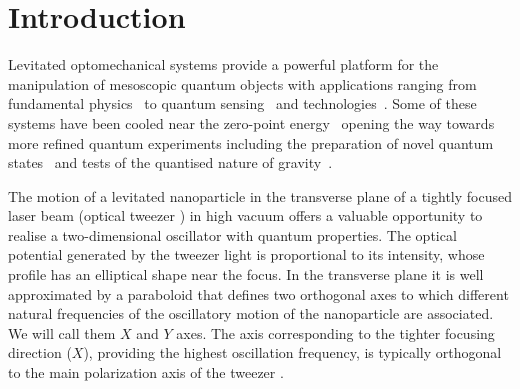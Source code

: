 \documentclass[11pt,floatfix,amssymb,prx,aps,longbibliography,superscriptaddress,nopacs]{revtex4-2}
\begin{document}
\maketitle

\section*{Introduction}
Levitated optomechanical systems provide a powerful platform for the manipulation of mesoscopic quantum objects with applications ranging from fundamental physics~\cite{Li2010,Moore2022,Gratta2014} to quantum sensing~\cite{Geraci2010,Tania2024} and technologies~\cite{Vinante2024}. Some of these systems have been cooled near the zero-point energy~\cite{Delic2020,Ranfagni2022,Piotrowski2023,Magrini2021,Tebbenjohanns2021} opening the way towards more refined quantum experiments including the preparation of novel quantum states~\cite{RomeroIsart2024,Neumeier2024,Nothup2024,Frimmer2024} and tests of the quantised nature of gravity~\cite{Bose2017}.

The motion of a levitated nanoparticle in the transverse plane of a tightly focused laser beam (optical tweezer \cite{Ashkin1970}) in high vacuum \cite{Millen2020,Gonzalez-Ballestero2021} offers a valuable opportunity to realise a two-dimensional oscillator with quantum properties. The optical potential generated by the tweezer light is proportional to its intensity, whose profile has an elliptical shape near the focus. In the transverse plane it is well approximated by a paraboloid that defines two orthogonal axes to which different natural frequencies of the oscillatory motion of the nanoparticle are associated. We will call them $X$ and $Y$ axes. The axis corresponding to the tighter focusing direction ($X$), providing the highest oscillation frequency, is typically orthogonal to the main polarization axis of the tweezer \cite{Novotny2012}. 
\end{document}
